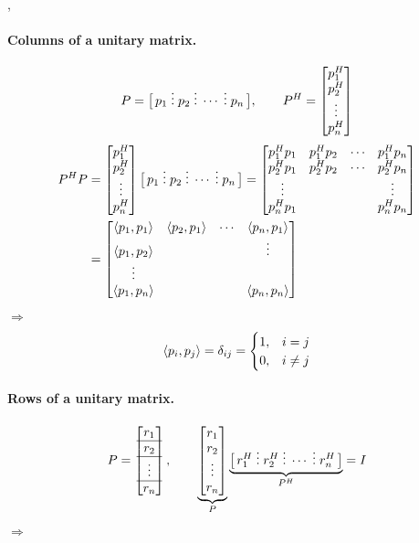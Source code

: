 \sep
\paragraph{Columns of a unitary matrix.}
\[
P = \bigl[\, p_1 \;\vdots\; p_2 \;\vdots\; \cdots \;\vdots\; p_n \,\bigr],
\qquad
P^{H} = \begin{bmatrix}p_1^{H}\\ p_2^{H}\\ \vdots\\ p_n^{H}\end{bmatrix}
\]
\begin{align*}
P^{H} P &= \begin{bmatrix}p_1^{H}\\ p_2^{H}\\ \vdots\\ p_n^{H}\end{bmatrix}\bigl[\, p_1 \;\vdots\; p_2 \;\vdots\; \cdots \;\vdots\; p_n \,\bigr]
= \begin{bmatrix}p_1^{H} p_1 & p_1^{H} p_2 & \cdots & p_1^{H} p_n\\
p_2^{H} p_1 & p_2^{H} p_2 & \cdots & p_2^{H} p_n\\
\vdots & & & \vdots\\
p_n^{H} p_1 & & & p_n^{H} p_n\end{bmatrix}\\
&= \begin{bmatrix}\left\langle p_1, p_1 \right\rangle & \left\langle p_2, p_1 \right\rangle & \cdots & \left\langle p_n, p_1 \right\rangle\\
\left\langle p_1, p_2 \right\rangle & & & \vdots\\
\vdots & & & \\
\left\langle p_1, p_n \right\rangle & & & \left\langle p_n, p_n \right\rangle\end{bmatrix}
\end{align*}
$\Rightarrow$ 
\[
\left\langle p_i, p_j \right\rangle = \delta_{ij} = \begin{cases} 1, & i=j\\ 0, & i\neq j\end{cases}
\]

\paragraph{Rows of a unitary matrix.}
\begingroup\renewcommand{\arraystretch}{1.25}%
\[
P = \begin{bmatrix}r_1\\ \hline r_2\\ \hline \vdots\\ \hline r_n\end{bmatrix},
\qquad
\underbrace{\begin{bmatrix}r_1\\ r_2\\ \vdots\\ r_n\end{bmatrix}}_{P}
\underbrace{\bigl[\, r_1^{H} \;\vdots\; r_2^{H} \;\vdots\; \cdots \;\vdots\; r_n^{H} \,\bigr]}_{P^{H}} = I
\]\endgroup
$\Rightarrow$ 

